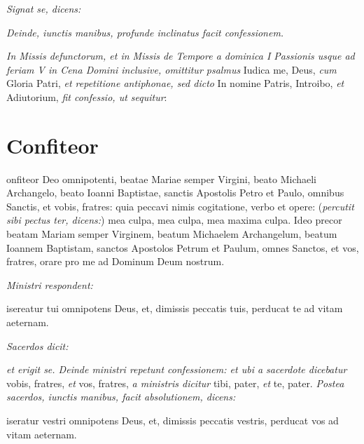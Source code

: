 
\textit{Signat se, dicens:}


\textit{Deinde, iunctis manibus, profunde inclinatus facit confessionem.}

\pagebreak

\divisio

\textit{In Missis defunctorum, et in Missis de Tempore a dominica I Passionis
usque ad feriam V in Cena Domini inclusive, omittitur psalmus} Iudica me, Deus,
\textit{cum} Gloria Patri, \textit{et repetitione antiphonae, sed dicto} In
nomine Patris, Introibo, \textit{et} Adiutorium, \textit{fit confessio, ut
sequitur}:

\divisio

\section{Confiteor}

onfiteor Deo omnipotenti, beatae Mariae semper Virgini, beato
Michaeli Archangelo, beato Ioanni Baptistae, sanctis Apostolis Petro et Paulo,
omnibus Sanctis, et vobis, fratres: quia peccavi nimis cogitatione, verbo et
opere: (\textit{percutit sibi pectus ter, dicens:}) mea culpa, mea culpa, mea
maxima culpa.  Ideo precor beatam Mariam semper Virginem, beatum Michaelem
Archangelum, beatum Ioannem Baptistam, sanctos Apostolos Petrum et Paulum, omnes
Sanctos, et vos, fratres, orare pro me ad Dominum Deum nostrum.

\textit{Ministri respondent:}

isereatur tui omnipotens Deus, et, dimissis peccatis tuis, perducat
te ad vitam aeternam.

\textit{Sacerdos dicit:}


\textit{et erigit se.  Deinde ministri repetunt confessionem: et ubi a sacerdote
dicebatur} vobis, fratres, \textit{et} vos, fratres, \textit{a ministris
dicitur} tibi, pater, \textit{et} te, pater.  \textit{Postea sacerdos, iunctis
manibus, facit absolutionem, dicens:}

iseratur vestri omnipotens Deus, et, dimissis peccatis vestris,
perducat vos ad vitam aeternam.

